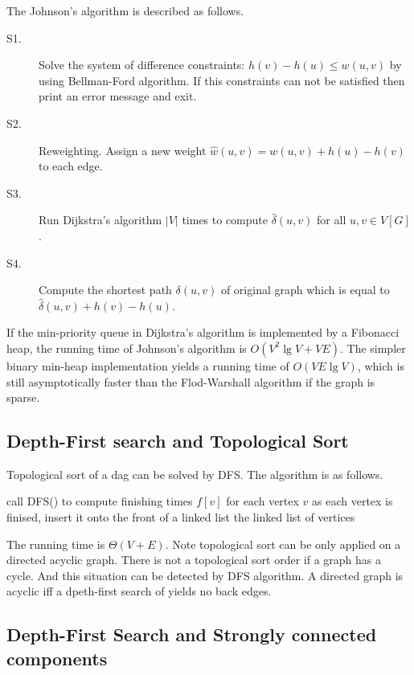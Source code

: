 \documentclass[12pt]{article}
\begin{document}
The Johnson's algorithm is described as follows.
\begin{description}
    \item[S1.] Solve the system of difference constraints: $h(v)-h(u) \leq
    w(u, v)$ by using Bellman-Ford algorithm.  If this constraints can not
    be satisfied then print an error message and exit.
    \item[S2.] Reweighting.  Assign a new weight $\widehat{w}(u,v) = w(u,v)+h(u)-h(v)$ to
    each edge.
    \item[S3.] Run Dijkstra's algorithm $|V|$ times to compute
    $\widehat\delta(u,v)$ for all $u, v \in V[G]$.
    \item[S4.] Compute the shortest path $\delta(u,v)$ of original graph
    which is equal to $\widehat\delta(u,v) + h(v) - h(u)$.
\end{description}

If the min-priority queue in Dijkstra's algorithm is implemented by a
Fibonacci heap, the running time of Johnson's algorithm is
$O(V^2\lg{V}+VE)$.  The simpler binary min-heap implementation yields a
running time of $O(VE\lg{V})$, which is still asymptotically faster than
the Flod-Warshall algorithm if the graph is sparse.

\subsection{Depth-First search and Topological Sort}

Topological sort of a dag can be solved by DFS.  The algorithm is as
follows.

\begin{codebox}
\li call DFS() to compute finishing times $f[v]$ for each vertex $v$ 
    as each vertex is finised, 
    \Indentmore
\zi     insert it onto the front of a linked list
    \End
\li \Return the linked list of vertices
\end{codebox}

The running time is $\Theta(V+E)$.  Note topological sort can be only
applied on a directed acyclic graph.  There is not a topological sort order if 
a graph has a cycle.  And this situation can be detected by DFS algorithm.
A directed graph  is acyclic if\mbox{}f a dpeth-first search of  yields no
back edges.

\subsection{Depth-First Search and Strongly connected components}
\end{document}
